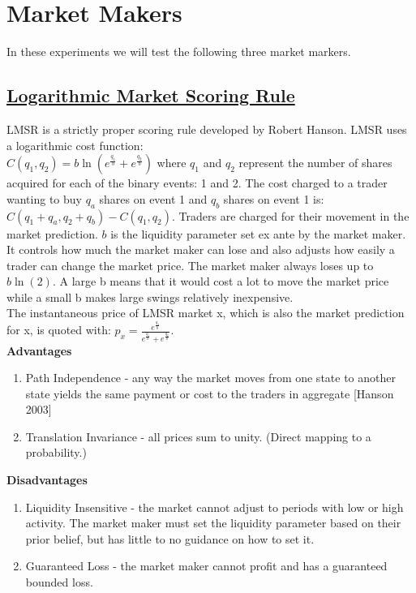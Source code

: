 \section{Market Makers}
In these experiments we will test the following three market markers.

\subsection{\href{http://mason.gmu.edu/~rhanson/mktscore.pdf}{Logarithmic Market Scoring Rule}}
LMSR is a strictly proper scoring rule developed by Robert Hanson. LMSR uses a logarithmic cost function: \\
$C(q_1,q_2) = b\ln(e^{\frac{q_1}{b}} + e^{\frac{q_2}{b}})$ where $q_1$ and $q_2$ represent the number of shares acquired for each of the binary events: 1 and 2. The cost charged to a trader wanting to buy $q_a$ shares on event 1 and $q_b$ shares on event 1 is: $C(q_1 + q_a, q_2 + q_b) - C(q_1,q_2)$. Traders are charged for their movement in the market prediction. $b$ is the liquidity parameter set ex ante by the market maker. It controls how much the market maker can lose and also adjusts how easily a trader can change the market price. The market maker always loses up to $b\ln(2)$. A large b means that it would cost a lot to move the market price while a small b makes large swings relatively inexpensive.\\

The instantaneous price of LMSR market x, which is also the market prediction for x, is quoted with: $p_x = \frac{e^{\frac{q_1}{b}}}{e^{\frac{q_1}{b}} + e^{\frac{q_2}{b}}}$. \\

\textbf{Advantages}\\
\begin{enumerate}
\item{Path Independence - any way the market moves from one state to another state yields the same payment or cost to the traders in aggregate [Hanson 2003]}
\item{Translation Invariance - all prices sum to unity. (Direct mapping to a probability.)}
\end{enumerate}

\textbf{Disadvantages} \\
\begin{enumerate}
\item{Liquidity Insensitive - the market cannot adjust to periods with low or high activity. The market maker must set the liquidity parameter based on their prior belief, but has little to no guidance on how to set it.}
\item{Guaranteed Loss - the market maker cannot profit and has a guaranteed bounded loss.}
\end{enumerate}

